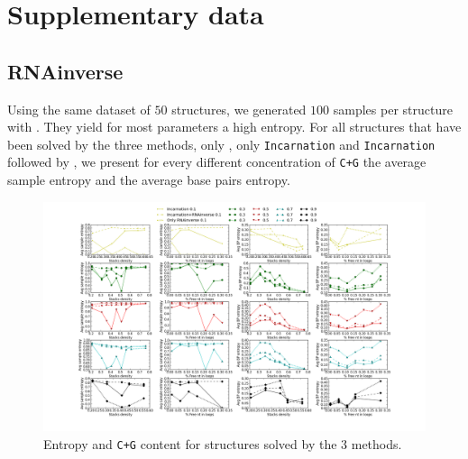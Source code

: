 \section{Supplementary data}
\subsection{RNAinverse}
Using the same dataset of $50$ structures, we generated $100$ samples
per structure with \RNAinverse. They yield for most parameters
a high entropy. For all structures that have been solved 
by the three methods, only \RNAinverse, only \texttt{Incarnation} and
\texttt{Incarnation} followed by \RNAinverse,
we present for every different concentration of \texttt{C+G}
the average sample entropy and the average base pairs entropy.


\begin{figure}[ht!]
	\centering
	\includegraphics[scale=0.4]{Figures/RNAinverse_data_100.png}
	\caption{Entropy and \texttt{C+G} content for structures solved by
	the 3 methods.}
	\label{fig:rnainverse}
\end{figure}

%
